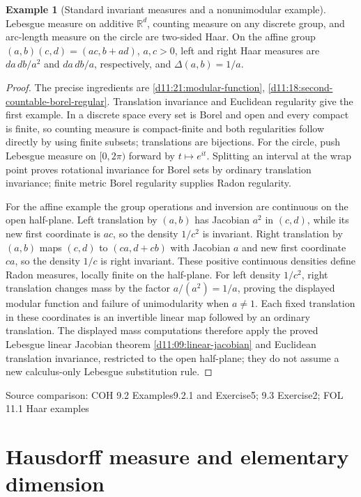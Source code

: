 \documentclass[11pt,oneside,openany]{book}
\theoremstyle{definition}
\newtheorem{example}[theorem]{Example}
\theoremstyle{remark}
\newcommand{\R}{\mathbb R}\newcommand{\C}{\mathbb C}
\newcommand{\family}[1]{}
\newcommand{\source}[1]{\par\begingroup\small\sffamily\color{black!65}Source comparison: #1\par\endgroup}
\begin{document}
\begin{example}[Standard invariant measures and a nonunimodular example]\family{D11.21.haar_examples_and_nonunimodular}\label{d11:21:haar-examples-and-nonunimodular}
Lebesgue measure on additive $\R^d$, counting measure on any discrete group, and arc-length measure on the circle are two-sided Haar. On the affine group $(a,b)(c,d)=(ac,b+ad)$, $a,c>0$, left and right Haar measures are $da\,db/a^2$ and $da\,db/a$, respectively, and $\Delta(a,b)=1/a$.
\end{example}
\begin{proof}
The precise ingredients are \cref{d11:21:modular-function}, \cref{d11:18:second-countable-borel-regular}. Translation invariance and Euclidean regularity give the first example. In a discrete space every set is Borel and open and every compact is finite, so counting measure is compact-finite and both regularities follow directly by using finite subsets; translations are bijections. For the circle, push Lebesgue measure on $[0,2\pi)$ forward by $t\mapsto e^{it}$. Splitting an interval at the wrap point proves rotational invariance for Borel sets by ordinary translation invariance; finite metric Borel regularity supplies Radon regularity.

For the affine example the group operations and inversion are continuous on the open half-plane. Left translation by $(a,b)$ has Jacobian $a^2$ in $(c,d)$, while its new first coordinate is $ac$, so the density $1/c^2$ is invariant. Right translation by $(a,b)$ maps $(c,d)$ to $(ca,d+cb)$ with Jacobian $a$ and new first coordinate $ca$, so the density $1/c$ is right invariant. These positive continuous densities define Radon measures, locally finite on the half-plane. For left density $1/c^2$, right translation changes mass by the factor $a/(a^2)=1/a$, proving the displayed modular function and failure of unimodularity when $a\ne1$. Each fixed translation in these coordinates is an invertible linear map followed by an ordinary translation. The displayed mass computations therefore apply the proved Lebesgue linear Jacobian theorem \cref{d11:09:linear-jacobian} and Euclidean translation invariance, restricted to the open half-plane; they do not assume a new calculus-only Lebesgue substitution rule.
\end{proof}
\source{COH 9.2 Examples9.2.1 and Exercise5; 9.3 Exercise2; FOL 11.1 Haar examples}



\chapter{Hausdorff measure and elementary dimension}\label{ch:d11-22}
\end{document}
